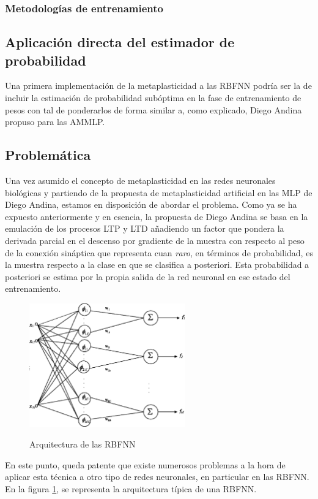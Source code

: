 \documentclass[10pt,a4paper]{report}
\begin{document}
\subsubsection{Metodologías de entrenamiento}
\subsection{Aplicación directa del estimador de probabilidad}
Una primera implementación de la metaplasticidad a las RBFNN podría ser la de incluir la estimación de probabilidad subóptima en la fase de entrenamiento de pesos con tal de ponderarlos de forma similar a, como explicado, Diego Andina propuso para las AMMLP.
\subsection{Problemática}
Una vez asumido el concepto de metaplasticidad en las redes neuronales biológicas y partiendo de la propuesta de metaplasticidad artificial en las MLP de Diego Andina, estamos en disposición de abordar el problema. 
Como ya se ha expuesto anteriormente y en esencia, la propuesta de Diego Andina se basa en la emulación de los procesos LTP y LTD añadiendo un factor que pondera la derivada parcial en el descenso por gradiente de la muestra con respecto al peso de la conexión sináptica que representa cuan \textit{raro}, en términos de probabilidad, es la muestra respecto a la clase en que se clasifica a posteriori. Esta probabilidad a posteriori se estima por la propia salida de la red neuronal en ese estado del entrenamiento. 

\begin{figure}[h!]{}
    \centering
    \includegraphics[width=0.6\textwidth]{img/RBFN1.png}
    \label{fig:RBFNN1}
    \caption{Arquitectura de las RBFNN}
\end{figure}

En este punto, queda patente que existe numerosos problemas a la hora de aplicar esta técnica a otro tipo de redes neuronales, en particular en las RBFNN. En la figura \ref{fig:RBFNN1}, se representa la arquitectura típica de una RBFNN.
\end{document}
